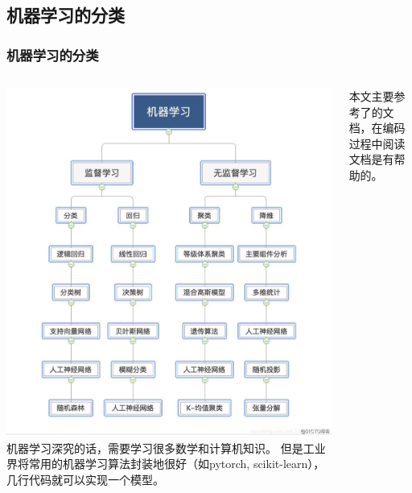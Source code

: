 \documentclass[mathserif,envcountsect,fontset=mac]{ctexbeamer}
\begin{document}
\subsection{机器学习的分类}
\begin{frame}
    \frametitle{机器学习的分类}
    \begin{columns}
        \includegraphics[width=.9\textwidth]{../lib/机器学习.jpeg}
        机器学习深究的话，需要学习很多数学和计算机知识。
        但是工业界将常用的机器学习算法封装地很好（如pytorch, scikit-learn），几行代码就可以实现一个模型。

        本文主要参考了\textcite{scikit-learn}的文档，在编码过程中阅读文档是有帮助的。
    \end{columns}
\end{frame}
\end{document}
